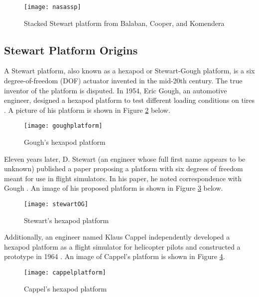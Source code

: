 \documentclass[11pt]{ucthesisCP}
\begin{document}
\begin{figure}[htbp]
	\centering
	\texttt{[image: nasassp]}
	\caption{Stacked Stewart platform from Balaban, Cooper, and Komendera \cite{nasaSSPpaper}}
	\label{fig:nasassp}
\end{figure}

\subsection{Stewart Platform Origins} \label{ssec:2s1s1}
A Stewart platform, also known as a hexapod or Stewart-Gough platform, is a six degree-of-freedom (DOF) actuator invented in the mid-20th century. The true inventor of the platform is disputed. In 1954, Eric Gough, an automotive engineer, designed a hexapod platform to test different loading conditions on tires \cite{parallelorigins}. A picture of his platform is shown in Figure \ref{fig:goughplatform} below.

\begin{figure}[htbp]
	\centering
	\texttt{[image: goughplatform]}
	\caption{Gough’s hexapod platform \cite{parallelorigins}}
	\label{fig:goughplatform}
\end{figure}

\vspace{1ex}
Eleven years later, D. Stewart (an engineer whose full first name appears to be unknown) published a paper proposing a platform with six degrees of freedom meant for use in flight simulators. In his paper, he noted correspondence with Gough \cite{stewartpaper}. An image of his proposed platform is shown in Figure \ref{fig:stewartOG} below.

\begin{figure}[htbp]
	\centering
	\texttt{[image: stewartOG]}
	\caption{Stewart’s hexapod platform \cite{stewartpaper}}
	\label{fig:stewartOG}
\end{figure}

Additionally, an engineer named Klaus Cappel independently developed a hexapod platform as a flight simulator for helicopter pilots and constructed a prototype in 1964 \cite{parallelorigins}. An image of Cappel’s platform is shown in Figure \ref{fig:cappelplatform}.

\begin{figure}[htbp]
	\centering
	\texttt{[image: cappelplatform]}
	\caption{Cappel’s hexapod platform \cite{parallelorigins}}
	\label{fig:cappelplatform}
\end{figure}
\end{document}
